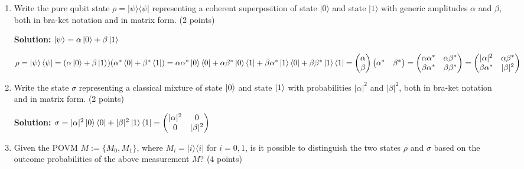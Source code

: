 \documentclass[12pt]{article}
\begin{document}
\begin{enumerate}
    \item Write the pure qubit state $\rho = |\psi\rangle\langle\psi|$ representing a coherent superposition of state $|0\rangle$ and state $|1\rangle$ with generic amplitudes $\alpha$ and $\beta$, both in bra-ket notation and in matrix form. (2 points)

          \textbf{Solution:}
          $\ket{\psi} = \alpha\ket{0}+\beta\ket{1}$

          $\rho = \ket{\psi}\bra{\psi} =
              (\alpha\ket{0}+\beta\ket{1})(\alpha^*\bra{0}+\beta^*\bra{1})=\alpha\alpha^*\ket{0}\bra{0}+
              \alpha\beta^*\ket{0}\bra{1}+\beta\alpha^*\ket{1}\bra{0}+\beta\beta^*\ket{1}\bra{1}=
              \begin{pmatrix}
                  \alpha \\
                  \beta
              \end{pmatrix}\begin{pmatrix}
                  \alpha^* & \beta^*
              \end{pmatrix} = \begin{pmatrix}
                  \alpha\alpha^* & \alpha\beta^* \\
                  \beta\alpha^*  & \beta\beta^*
              \end{pmatrix}
              =\begin{pmatrix}
                  |\alpha|^2    & \alpha\beta^* \\
                  \beta\alpha^* & |\beta|^2
              \end{pmatrix}
          $

    \item Write the state $\sigma$ representing a classical mixture of state $\ket{0}$ and state $\ket{1}$ with probabilities $|\alpha|^2$ and $|\beta|^2$, both in bra-ket notation and in matrix form. (2 points)

          \textbf{Solution:}
          $\sigma = |\alpha|^2\ket{0}\bra{0}+|\beta|^2\ket{1}\bra{1}=
              \begin{pmatrix}
                  |\alpha|^2 & 0         \\
                  0          & |\beta|^2
              \end{pmatrix}$

    \item Given the POVM $M := \{M_0, M_1\}$, where $M_i = |i\rangle\langle i|$ for $i = 0, 1$, is it possible to distinguish the two states $\rho$ and $\sigma$ based on the outcome probabilities of the above measurement $M$? (4 points)



\end{enumerate}
\end{document}
